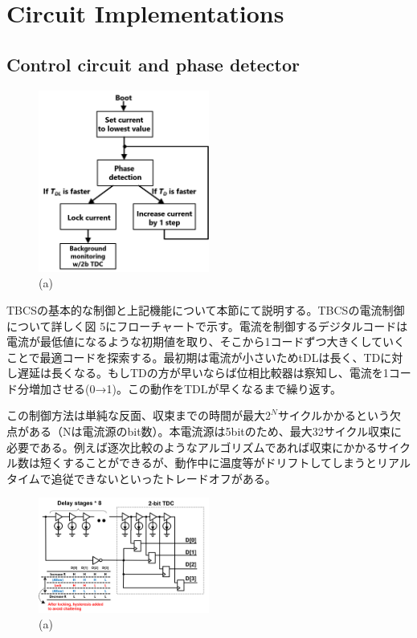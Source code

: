 \documentclass[letterpaper, 10 pt, conference]{ieeeconf}  %
\begin{document}
\section{Circuit Implementations}
\subsection{Control circuit and phase detector}
\begin{figure}[!]
\centering
 \includegraphics[width=0.5\textwidth]{figs/flowchart.png}
  \caption{(a) 
}
\label{fig2}
\end{figure}
TBCSの基本的な制御と上記機能について本節にて説明する。TBCSの電流制御について詳しく図 5にフローチャートで示す。電流を制御するデジタルコードは電流が最低値になるような初期値を取り、そこから1コードずつ大きくしていくことで最適コードを探索する。最初期は電流が小さいためtDLは長く、TDに対し遅延は長くなる。もしTDの方が早いならば位相比較器は察知し、電流を1コード分増加させる(0→1)。この動作をTDLが早くなるまで繰り返す。

この制御方法は単純な反面、収束までの時間が最大$2^N$サイクルかかるという欠点がある（Nは電流源のbit数）。本電流源は5bitのため、最大32サイクル収束に必要である。例えば逐次比較のようなアルゴリズムであれば収束にかかるサイクル数は短くすることができるが、動作中に温度等がドリフトしてしまうとリアルタイムで追従できないといったトレードオフがある。

\begin{figure}[!]
\centering
 \includegraphics[width=0.5\textwidth]{figs/tdc.png}
  \caption{(a) 
}
\label{fig2}
\end{figure}
\end{document}
